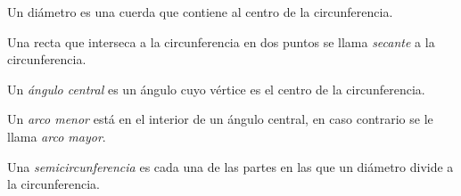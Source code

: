 \begin{definition}
    Un diámetro es una cuerda que contiene al centro de la circunferencia.

    \begin{figure}[!h]
        \centering
        
        \label{fig:diametro}
    \end{figure}
    
\end{definition}

\begin{definition}
    Una recta que interseca a la circunferencia en dos puntos se llama \textit{secante} a la circunferencia.

    \begin{figure}[!h]
        \centering
        
        \label{fig:secante}
    \end{figure}
    
\end{definition}

\clearpage

\begin{definition}
    Un \textit{ángulo central} es un ángulo cuyo vértice es el centro de la circunferencia.

    \begin{figure}[!h]
        \centering
        
        \label{fig:ang-central}
    \end{figure}
    
\end{definition}

\begin{definition}
    Un \textit{arco menor} está en el interior de un ángulo central, en caso contrario se le llama \textit{arco mayor}.

    \begin{figure}[!h]
        \centering
        
        \label{fig:arcos}
    \end{figure}
\end{definition}

\begin{definition}
    Una \textit{semicircunferencia} es cada una de las partes en las que un diámetro divide a la circunferencia.
\end{definition}

